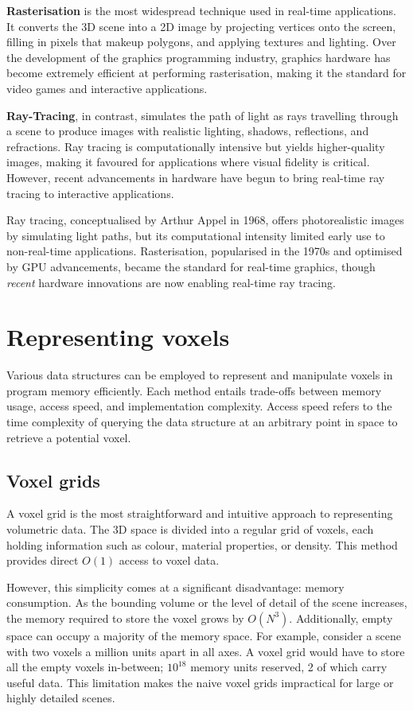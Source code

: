 \textbf{Rasterisation} is the most widespread technique used in real-time applications.
It converts the 3D scene into a 2D image by projecting vertices onto the screen, filling in pixels that makeup polygons, and applying textures and lighting.
Over the development of the graphics programming industry, graphics hardware has become extremely efficient at performing rasterisation, making it the standard for video games and interactive applications.

\textbf{Ray-Tracing}, in contrast, simulates the path of light as rays travelling through a scene to produce images with realistic lighting, shadows, reflections, and refractions. Ray tracing is computationally intensive but yields higher-quality images, making it favoured for applications where visual fidelity is critical. However, recent advancements in hardware have begun to bring real-time ray tracing to interactive applications.

Ray tracing, conceptualised by Arthur Appel in 1968\supercite{appel}, offers photorealistic images by simulating light paths, but its computational intensity limited early use to non-real-time applications. Rasterisation, popularised in the 1970s and optimised by GPU advancements, became the standard for real-time graphics, though \emph{recent} hardware innovations are now enabling real-time ray tracing.

\section{Representing voxels}
Various data structures can be employed to represent and manipulate voxels in program memory efficiently. Each method entails trade-offs between memory usage, access speed, and implementation complexity. Access speed refers to the time complexity of querying the data structure at an arbitrary point in space to retrieve a potential voxel.

\subsection{Voxel grids}
A voxel grid is the most straightforward and intuitive approach to representing volumetric data. The 3D space is divided into a regular grid of voxels, each holding information such as colour, material properties, or density. This method provides direct $O(1)$ access to voxel data.

However, this simplicity comes at a significant disadvantage: memory consumption.
As the bounding volume or the level of detail of the scene increases, the memory required to store the voxel grows by $O(N^{3})$.
Additionally, empty space can occupy a majority of the memory space.
For example, consider a scene with two voxels a million units apart in all axes.
A voxel grid would have to store all the empty voxels in-between; $10^{18}$ memory units reserved, 2 of which carry useful data.
This limitation makes the naive voxel grids impractical for large or highly detailed scenes.

